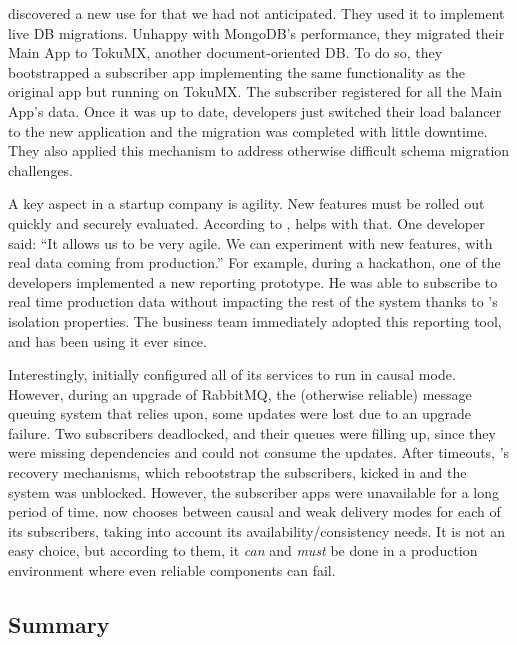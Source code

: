  \crowdtap discovered a new use for
\synapse that we had not anticipated.  They used it to implement live DB
migrations.  Unhappy with MongoDB's performance, they migrated their Main App to
TokuMX, another document-oriented DB.  To do so, they bootstrapped a subscriber
app implementing the same functionality as the original app but running on
TokuMX. The subscriber registered for all the Main App's data.  Once it was up
to date, developers just switched their load balancer to the new application and
the migration was completed with little downtime.  They also applied this
mechanism to address otherwise difficult schema migration challenges.

 A key aspect in a startup company is
agility.  New features must be rolled out quickly and securely evaluated.
According to \crowdtap, \synapse helps with that. One developer said: ``It
allows us to be very agile. We can experiment with new features, with real
data coming from production.''  For example, during a hackathon, one of the
developers implemented a new reporting prototype. He was able to subscribe to
real time production data without impacting the rest of the system thanks to
\synapse's isolation properties. The business team immediately adopted this
reporting tool, and has been using it ever since.

 Interestingly, \crowdtap initially
configured all of its services to run in causal mode.  However, during an
upgrade of RabbitMQ, the (otherwise reliable) message queuing system that
\synapse relies upon, some updates were lost due to an upgrade failure.
Two subscribers deadlocked, and their queues were filling up, since they were
missing dependencies and could not consume the updates.  After timeouts, \synapse's
recovery mechanisms, which rebootstrap the subscribers, kicked in
and the system was unblocked.  However, the subscriber apps were unavailable for
a long period of time. \crowdtap now chooses between causal and weak delivery
modes for each of its subscribers, taking into account its availability/consistency
needs.  It is not an easy choice, but according to them, it {\em can} and {\em must}
be done in a production environment where even reliable components can fail.

\subsection{Summary}

